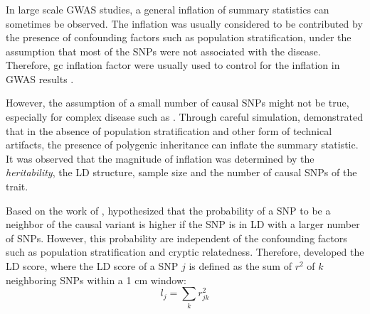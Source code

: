 	\subsubsection{}
	In large scale \gls{GWAS} studies, a general inflation of summary statistics can sometimes be observed.
	The inflation was usually considered to be contributed by the presence of confounding factors such as population stratification, under the assumption that most of the \glspl{SNP} were not associated with the disease.
	Therefore, \gls{gc} inflation factor were usually used to control for the inflation in \gls{GWAS} results \citep{Zheng2006}.
	
	However, the assumption of a small number of causal \glspl{SNP} might not be true, especially for complex disease such as .
	Through careful simulation, \citet{Yang2011b} demonstrated that in the absence of population stratification and other form of technical artifacts, the presence of polygenic inheritance can inflate the summary statistic.
	It was observed that the magnitude of inflation was determined by the \emph{heritability}, the \gls{LD} structure, sample size and the number of causal \glspl{SNP} of the trait.
%	
	
	Based on the work of \citet{Yang2011b}, \citet{Bulik-Sullivan2015} hypothesized that the probability of a \gls{SNP} to be a neighbor of the causal variant is higher if the \gls{SNP} is in \gls{LD} with a larger number of \glspl{SNP}.
	However, this probability are independent of the confounding factors such as population stratification and cryptic relatedness.
	Therefore, \citet{Bulik-Sullivan2015} developed the \gls{LD} score, where the \gls{LD} score of a \gls{SNP} $j$ is defined as the sum of $r^2$ of $k$ neighboring \glspl{SNP} within a 1 \gls{cm} window:
	\begin{equation}
	l_j = \sum_kr^2_{jk}
	\label{eq:ldScore}
	\end{equation}
	
